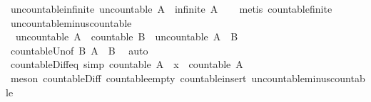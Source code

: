 \begin{isabellebody}
\endisatagproof
{\isafoldproof}%
%
\isadelimproof
\isanewline
%
\endisadelimproof
\isanewline
{}\isamarkupfalse%
\ uncountable{\isacharunderscore}infinite{\isacharcolon}\ {\isachardoublequoteopen}uncountable\ A\ {\isasymLongrightarrow}\ infinite\ A{\isachardoublequoteclose}\isanewline
%
\isadelimproof
\ \ %
\endisadelimproof
%
\isatagproof
{}\isamarkupfalse%
\ {\isacharparenleft}metis\ countable{\isacharunderscore}finite{\isacharparenright}%
\endisatagproof
{\isafoldproof}%
%
\isadelimproof
\isanewline
%
\endisadelimproof
\isanewline
{}\isamarkupfalse%
\ uncountable{\isacharunderscore}minus{\isacharunderscore}countable{\isacharcolon}\isanewline
\ \ {\isachardoublequoteopen}uncountable\ A\ {\isasymLongrightarrow}\ countable\ B\ {\isasymLongrightarrow}\ uncountable\ {\isacharparenleft}A\ {\isacharminus}\ B{\isacharparenright}{\isachardoublequoteclose}\isanewline
%
\isadelimproof
\ \ %
\endisadelimproof
%
\isatagproof
{}\isamarkupfalse%
\ countable{\isacharunderscore}Un{\isacharbrackleft}of\ B\ {\isachardoublequoteopen}A\ {\isacharminus}\ B{\isachardoublequoteclose}{\isacharbrackright}\ \isamarkupfalse%
\ auto%
\endisatagproof
{\isafoldproof}%
%
\isadelimproof
\isanewline
%
\endisadelimproof
\isanewline
{}\isamarkupfalse%
\ countable{\isacharunderscore}Diff{\isacharunderscore}eq\ {\isacharbrackleft}simp{\isacharbrackright}{\isacharcolon}\ {\isachardoublequoteopen}countable\ {\isacharparenleft}A\ {\isacharminus}\ {\isacharbraceleft}x{\isacharbraceright}{\isacharparenright}\ {\isacharequal}\ countable\ A{\isachardoublequoteclose}\isanewline
%
\isadelimproof
\ \ %
\endisadelimproof
%
\isatagproof
{}\isamarkupfalse%
\ {\isacharparenleft}meson\ countable{\isacharunderscore}Diff\ countable{\isacharunderscore}empty\ countable{\isacharunderscore}insert\ uncountable{\isacharunderscore}minus{\isacharunderscore}countable{\isacharparenright}%
\endisatagproof
{\isafoldproof}%
%
\isadelimproof
\isanewline
%
\endisadelimproof
%
\isadelimtheory
\isanewline
%
\endisadelimtheory
%
\isatagtheory
{}\isamarkupfalse%
%
\endisatagtheory
{\isafoldtheory}%
%
\isadelimtheory
%
\endisadelimtheory
%
\end{isabellebody}%
\endinput

